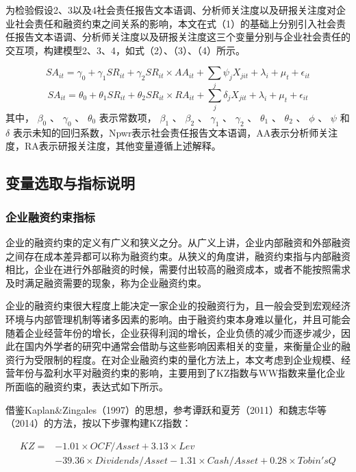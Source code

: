 \documentclass[12pt,a4paper]{article}
\begin{document}
为检验假设2、3以及4社会责任报告文本语调、分析师关注度以及研报关注度对企业社会责任和融资约束之间关系的影响，本文在式（1）的基础上分别引入社会责任报告文本语调、分析师关注度以及研报关注度这三个变量分别与企业社会责任的交互项，构建模型2、3、4，如式（2）、（3）、（4）所示。

\begin{equation}
    SA_{it} = \gamma_0 + \gamma_1 SR_{it} + \gamma_2 SR_{it} \times AA_{it} + \sum_j \psi_j X_{jit} + \lambda_i + \mu_t + \epsilon_{it} \label{eq3}
\end{equation}
\begin{equation}
    SA_{it} = \theta_0 + \theta_1 SR_{it} + \theta_2 SR_{it} \times RA_{it} + \sum_j \delta_j X_{jit} + \lambda_i + \mu_t + \epsilon_{it} \label{eq4}
\end{equation}
其中， \(\beta_0\) 、 \(\gamma_0\) 、 \(\theta_0\) 表示常数项， \(\beta_1\) 、 \(\beta_2\) 、 \(\gamma_1\) 、 \(\gamma_2\) 、 \(\theta_1\) 、 \(\theta_2\) 、 \(\phi\) 、 \(\psi\) 和 \(\delta\) 表示未知的回归系数，Npwr表示社会责任报告文本语调，AA表示分析师关注度，RA表示研报关注度，其他变量遵循上述解释。

\subsection{变量选取与指标说明}

\subsubsection{企业融资约束指标}

企业的融资约束的定义有广义和狭义之分。从广义上讲，企业内部融资和外部融资之间存在成本差异都可以称为融资约束。从狭义的角度讲，融资约束指与内部融资相比，企业在进行外部融资的时候，需要付出较高的融资成本，或者不能按照需求及时满足融资需要的现象，称为企业融资约束。

企业的融资约束很大程度上能决定一家企业的投融资行为，且一般会受到宏观经济环境与内部管理机制等诸多因素的影响。由于融资约束本身难以量化，并且可能会随着企业经营年份的增长，企业获得利润的增长，企业负债的减少而逐步减少，因此在国内外学者的研究中通常会借助与这些影响因素相关的变量，来衡量企业的融资行为受限制的程度。在对企业融资约束的量化方法上，本文考虑到企业规模、经营年份与盈利水平对融资约束的影响，主要用到了KZ指数与WW指数来量化企业所面临的融资约束，表达式如下所示。

借鉴Kaplan\&Zingales（1997）的思想，参考谭跃和夏芳（2011）和魏志华等（2014）的方法，按以下步骤构建KZ指数：

\begin{equation}
    \begin{split}
        KZ = &-1.01 \times OCF/Asset + 3.13 \times Lev \\
        &- 39.36 \times Dividends/Asset - 1.31 \times Cash/Asset + 0.28 \times Tobin's Q
    \end{split}
    \label{eq5}
\end{equation}
\end{document}
